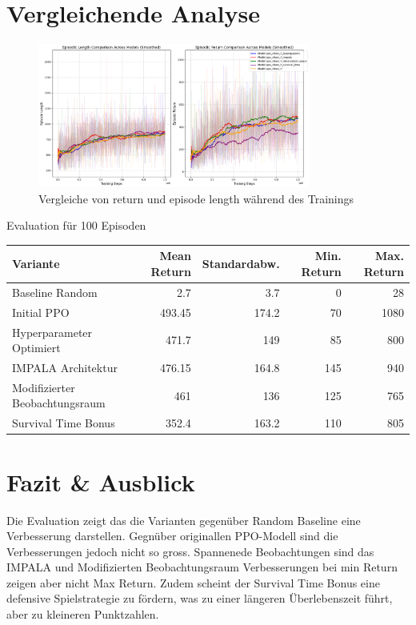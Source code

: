 \documentclass{article}
\begin{document}
\section{Vergleichende Analyse}
\begin{figure}[H]
    \centering
    \includegraphics[width=0.8\textwidth]{./Figure_3.png}
    \caption{Vergleiche von return und episode length während des Trainings}
\end{figure}

Evaluation für 100 Episoden

\begin{tabular}{lrrrr}
\toprule
Variante & Mean Return & Standardabw. & Min. Return & Max. Return \\
\midrule
Baseline Random & 2.7 & 3.7 & 0 & 28 \\
Initial PPO & 493.45 & 174.2 & 70 & 1080 \\
Hyperparameter Optimiert & 471.7 & 149 & 85 & 800 \\
IMPALA Architektur & 476.15 & 164.8 & 145 & 940 \\
Modifizierter Beobachtungsraum & 461 & 136 & 125 & 765 \\
Survival Time Bonus & 352.4 & 163.2 & 110 & 805 \\
\bottomrule
\end{tabular}

\section{Fazit \& Ausblick}

Die Evaluation zeigt das die Varianten gegenüber Random Baseline eine Verbesserung darstellen. Gegnüber originallen PPO-Modell sind die Verbesserungen jedoch nicht so gross.
Spannenede Beobachtungen sind das IMPALA und Modifizierten Beobachtungsraum Verbesserungen bei min Return zeigen aber nicht Max Return.
Zudem scheint der Survival Time Bonus eine defensive Spielstrategie zu fördern, was zu einer längeren Überlebenszeit führt, aber zu kleineren Punktzahlen.
\newline
\end{document}

